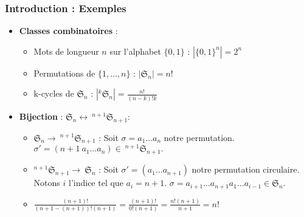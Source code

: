 \documentclass{beamer}
\begin{document}
\begin{frame}
    \frametitle{Introduction : Exemples}
    \begin{itemize}
        \item \textbf{Classes combinatoires} :
        \begin{itemize}
            \item Mots de longueur $n$ sur l'alphabet $\{0,1\}$ :
                $|\{0,1\}^n| = 2^n$
            \item Permutations de $\{1, \ldots, n\}$ :
                $|\mathfrak{S}_n| = n!$
            \item k-cycles de $\mathfrak{S}_n$ :
                $\displaystyle|^k\mathfrak{S}_n| = \frac{n!}{(n-k)!k}$
        \end{itemize}
        \item \textbf{Bijection} : $\mathfrak{S}_n \longleftrightarrow
            \ ^{n+1}\mathfrak{S}_{n+1}$:
            \begin{itemize}
                \item $\mathfrak{S}_n \to\ ^{n+1}\mathfrak{S}_{n+1}$ :
                Soit $\sigma = a_1 \ldots a_n$ notre permutation.
                    $\sigma' = (n+1 \ a_1 \ldots a_n) \in \ 
                    ^{n+1}\mathfrak{S}_{n+1}.$
                \item $^{n+1}\mathfrak{S}_{n+1} \to\ \mathfrak{S}_n$ :
                    Soit $\sigma' = (a_1 \ldots a_{n+1})$ notre permutation
                    circulaire. Notons $i$ l'indice tel que $a_i = n + 1$.
                    $\sigma = a_{i+1} \ldots a_{n+1} a_1 \ldots a_{i-1} \in 
                    \mathfrak{S}_n.$
                \item $\displaystyle \frac{(n+1)!}{(n+1 - (n+1))!(n+1)} =
                    \frac{(n+1)!}{0!(n+1)} = \frac{n!(n+1)}{n+1} = n!$
            \end{itemize}
    \end{itemize}
\end{frame}
\end{document}
